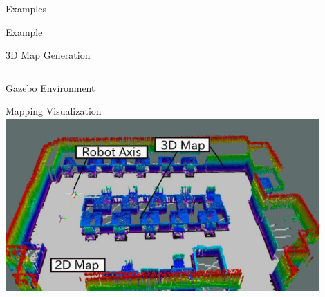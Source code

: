 \documentclass[9pt]{beamer}
\begin{document}
\begin{section}{Examples}
\begin{frame}{Example}
\begin{block}{3D Map Generation}
\begin{columns}
\begin{column}{0.5\textwidth}
\begin{block}{Gazebo Environment}
                    \end{block}
                    \begin{block}{Mapping Visualization}
                        \includegraphics[width=0.9\textwidth,trim={0cm 0cm 0cm 0cm},clip]{5-Figure8-1.png}
                    \end{block}                    
                \end{column}
            \end{columns}
        \end{block}
    \end{frame}
    

\end{section}
\end{document}
